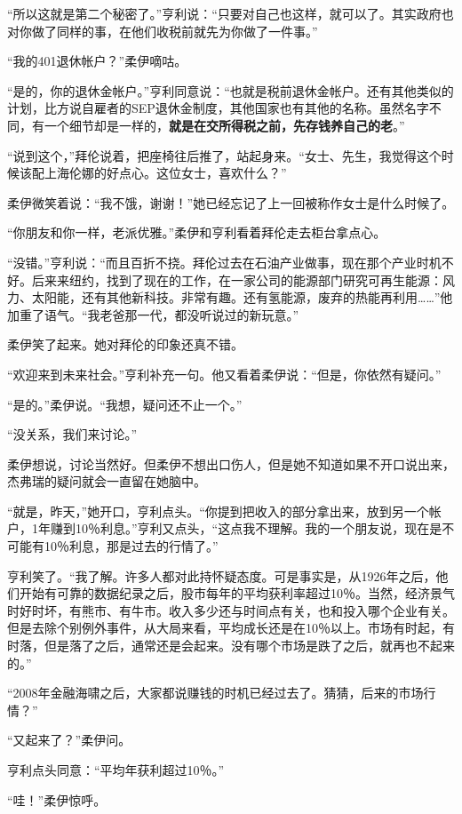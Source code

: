 “所以这就是第二个秘密了。”亨利说：“只要对自己也这样，就可以了。其实政府也对你做了同样的事，在他们收税前就先为你做了一件事。”

“我的401退休帐户？”柔伊嘀咕。

“是的，你的退休金帐户。”亨利同意说：“也就是税前退休金帐户。还有其他类似的计划，比方说自雇者的SEP退休金制度，其他国家也有其他的名称。虽然名字不同，有一个细节却是一样的，\textbf{就是在交所得税之前，先存钱养自己的老}。”

“说到这个，”拜伦说着，把座椅往后推了，站起身来。“女士、先生，我觉得这个时候该配上海伦娜的好点心。这位女士，喜欢什么？”

柔伊微笑着说：“我不饿，谢谢！”她已经忘记了上一回被称作女士是什么时候了。

“你朋友和你一样，老派优雅。”柔伊和亨利看着拜伦走去柜台拿点心。

“没错。”亨利说：“而且百折不挠。拜伦过去在石油产业做事，现在那个产业时机不好。后来来纽约，找到了现在的工作，在一家公司的能源部门研究可再生能源：风力、太阳能，还有其他新科技。非常有趣。还有氢能源，废弃的热能再利用……”他加重了语气。“我老爸那一代，都没听说过的新玩意。”

柔伊笑了起来。她对拜伦的印象还真不错。

“欢迎来到未来社会。”亨利补充一句。他又看着柔伊说：“但是，你依然有疑问。”

“是的。”柔伊说。“我想，疑问还不止一个。”

“没关系，我们来讨论。”

柔伊想说，讨论当然好。但柔伊不想出口伤人，但是她不知道如果不开口说出来，杰弗瑞的疑问就会一直留在她脑中。

“就是，昨天，”她开口，亨利点头。“你提到把收入的部分拿出来，放到另一个帐户，1年赚到10％利息。”亨利又点头，“这点我不理解。我的一个朋友说，现在是不可能有10％利息，那是过去的行情了。”

亨利笑了。“我了解。许多人都对此持怀疑态度。可是事实是，从1926年之后，他们开始有可靠的数据纪录之后，股市每年的平均获利率超过10％。当然，经济景气时好时坏，有熊市、有牛市。收入多少还与时间点有关，也和投入哪个企业有关。但是去除个别例外事件，从大局来看，平均成长还是在10％以上。市场有时起，有时落，但是落了之后，通常还是会起来。没有哪个市场是跌了之后，就再也不起来的。”

“2008年金融海啸之后，大家都说赚钱的时机已经过去了。猜猜，后来的市场行情？”

“又起来了？”柔伊问。

亨利点头同意：“平均年获利超过10％。”

“哇！”柔伊惊呼。

